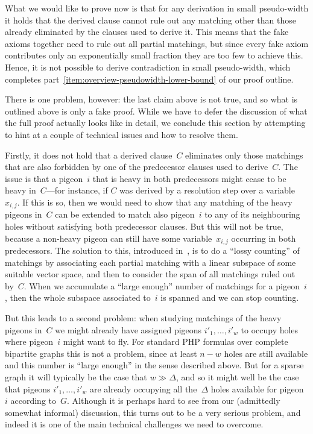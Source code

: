 \documentclass{theoretics}
\newcommand{\clc}{\ensuremath{C}}
\newcommand{\fakeaxiomintro}{fake axiom\xspace}
\newcommand{\heavy}{heavy\xspace}
\newcommand{\GdegMax}{\Delta}
\newcommand{\gdegmax}{\GdegMax}
\newcommand{\pseudowidth}{pseudo-width\xspace}
\numberwithin{equation}{section}
\begin{document}
What we would like to prove now is that for any 
derivation
in small \pseudowidth it holds that
the derived clause cannot rule out any matching other than those
already 
eliminated
by the clauses used to derive it.
This means that the \fakeaxiomintro{}s together need to rule out all
partial matchings,
but since every \fakeaxiomintro contributes only an exponentially
small fraction 
they are too few
to achieve this. Hence, it
is not
possible to derive contradiction in small \pseudowidth,
which completes 
part~\ref{item:overview-pseudowidth-lower-bound} 
of our proof outline.

There is one problem, however: the last claim above is not true, and
so what is outlined above is only a fake proof. While we have to defer
the discussion of what the full proof actually looks like in detail,
we conclude this section by attempting to hint at a couple of
technical issues and how to resolve them.


Firstly, it does not hold that a derived clause~$\clc$ eliminates only
those matchings that are also forbidden by one of the predecessor clauses
used to derive~$\clc$.  The issue is that a pigeon~$i$ that is \heavy
in both predecessors might cease to be \heavy in~$\clc$---for
instance, if $\clc$ was derived by a resolution step over a
variable~$x_{i,j}$. If this is so, then we would need to show that any
matching of the \heavy pigeons in~$\clc$ can be extended to match
also pigeon~$i$ to any of its neighbouring holes without satisfying
both predecessor clauses. But this will not be true, because a
non-\heavy pigeon can still have some variable~$x_{i,j}$ occurring in both
predecessors. The solution to this, introduced
in~\cite{Razborov03ResolutionLowerBoundsWFPHP}, is to do a  
``lossy counting'' of matchings by associating each partial matching
with a linear subspace of some suitable vector space, and then 
to consider
the span of all matchings ruled out
by~$\clc$. When we accumulate a ``large enough'' number of matchings for a
pigeon~$i$, then the whole subspace associated to~$i$ is spanned and
we can stop counting.

But this leads to a second problem: when studying matchings of the
\heavy pigeons in~$\clc$ we might already have assigned pigeons
$i'_1, \ldots, i'_w$ to occupy holes where pigeon~$i$ might want to fly.  For standard PHP
formulas over complete bipartite graphs this is not a problem, since
at least $n - w$ holes are still available and this number is ``large
enough'' in the sense described above. But for a sparse graph it will
typically be the case that $w \gg \gdegmax$, and so it might well be
the case that
pigeons $i'_1, \ldots, i'_w$ 
are already occupying all the~$\gdegmax$ holes available for pigeon~$i$
according to~$G$. Although it is perhaps hard to see from our
(admittedly somewhat informal) discussion, this turns out to be a very
serious problem, and indeed it is one of the main technical challenges
we need to overcome.
\end{document}
